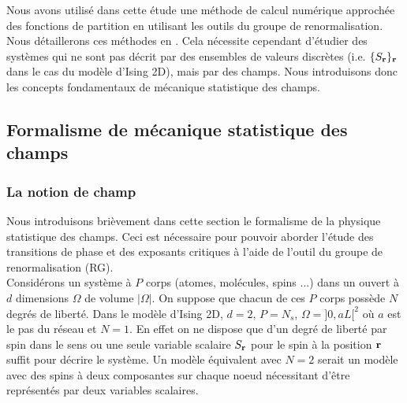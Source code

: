 \documentclass[10.5pt]{article}
\begin{document}
\begin{multicols*}{2}
Nous avons utilisé dans cette étude une méthode de calcul numérique approchée des fonctions de partition en utilisant les outils du groupe de renormalisation. Nous détaillerons ces méthodes en . Cela nécessite cependant d'étudier des systèmes qui ne sont pas décrit par des ensembles de valeurs discrètes (i.e. $\{S_{\bf r}\}_{\bf r}$ dans le cas du modèle d'Ising 2D), mais par des champs. Nous introduisons donc les concepts fondamentaux de mécanique statistique des champs. \\




\subsection{Formalisme de mécanique statistique des champs}

\label{sec:Origin}

\subsubsection{La notion de champ}

Nous introduisons brièvement dans cette section le formalisme de la physique statistique \cite{diu2007thermodynamique} des champs. Ceci est nécessaire pour pouvoir aborder l'étude des transitions de phase et des exposants critiques à l'aide de l'outil du groupe de renormalisation (RG). \\

Considérons un système à $P$ corps (atomes, molécules, spins  ...) dans un ouvert à $d$ dimensions $\Omega$ de volume $|\Omega|$. On suppose que chacun de ces $P$ corps possède $N$ degrés de liberté. Dans le modèle d'Ising 2D, $d=2$, $P=N_s$, $\Omega = ]0, aL[^2$ où $a$ est le pas du réseau et $N=1$. En effet on ne dispose que d'un degré de liberté par spin dans le sens ou une seule variable scalaire $S_{\bf r}$ pour le spin à la position ${\bf r}$ suffit pour décrire le système. Un modèle équivalent avec $N=2$ serait un modèle avec des spins à deux composantes sur chaque noeud nécessitant d'être représentés par deux variables scalaires. \\


\end{multicols*}
\end{document}
